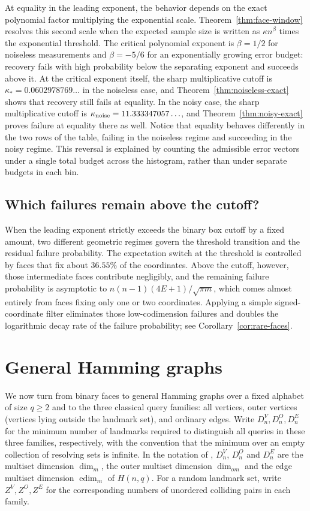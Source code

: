 \documentclass[11pt]{article}
\theoremstyle{definition}
\begin{document}
At equality in the leading exponent, the behavior depends on the exact polynomial factor multiplying the exponential scale. Theorem~\ref{thm:face-window} resolves this second scale when the expected sample size is written as \(\kappa n^\beta\) times the exponential threshold. The critical polynomial exponent is \(\beta=1/2\) for noiseless measurements and \(\beta=-5/6\) for an exponentially growing error budget: recovery fails with high probability below the separating exponent and succeeds above it. At the critical exponent itself, the sharp multiplicative cutoff is \(\kappa_*=0.0602978769\ldots\) in the noiseless case, and Theorem~\ref{thm:noiseless-exact} shows that recovery still fails at equality. In the noisy case, the sharp multiplicative cutoff is \(\kappa_{\rm noise}=11.333347057\ldots\), and Theorem~\ref{thm:noisy-exact} proves failure at equality there as well. Notice that equality behaves differently in the two rows of the table, failing in the noiseless regime and succeeding in the noisy regime. This reversal is explained by counting the admissible error vectors under a single total budget across the histogram, rather than under separate budgets in each bin.

\subsection{Which failures remain above the cutoff?}
When the leading exponent strictly exceeds the binary box cutoff by a fixed amount, two different geometric regimes govern the threshold transition and the residual failure probability. The expectation switch at the threshold is controlled by faces that fix about \(36.55\%\) of the coordinates. Above the cutoff, however, those intermediate faces contribute negligibly, and the remaining failure probability is asymptotic to \(n(n-1)(4E+1)/\sqrt{\pi m}\), which comes almost entirely from faces fixing only one or two coordinates. Applying a simple signed-coordinate filter eliminates those low-codimension failures and doubles the logarithmic decay rate of the failure probability; see Corollary~\ref{cor:rare-faces}.

\section{General Hamming graphs}
We now turn from binary faces to general Hamming graphs over a fixed alphabet of size \(q\ge2\) and to the three classical query families: all vertices, outer vertices (vertices lying outside the landmark set), and ordinary edges. Write \(D_n^V,D_n^O,D_n^E\) for the minimum number of landmarks required to distinguish all queries in these three families, respectively, with the convention that the minimum over an empty collection of resolving sets is infinite. In the notation of \cite{FKKY}, \(D_n^V\), \(D_n^O\) and \(D_n^E\) are the multiset dimension \(\dim_m\), the outer multiset dimension \(\dim_{om}\) and the edge multiset dimension \(\operatorname{edim}_m\) of \(H(n,q)\). For a random landmark set, write \(Z^V,Z^O,Z^E\) for the corresponding numbers of unordered colliding pairs in each family.
\end{document}

